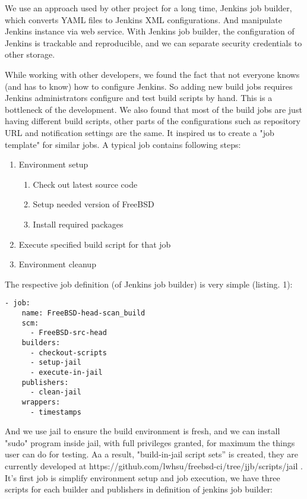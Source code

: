 \documentclass[a4paper,twocolumn,10pt]{article}
\begin{document}
We use an approach used by other project for a long time, Jenkins job builder,
which converts YAML files to Jenkins XML configurations. And manipulate Jenkins
instance via web service. With Jenkins job builder, the configuration of
Jenkins is trackable and reproducible, and we can separate security credentials
to other storage.

While working with other developers, we found the fact that not everyone knows
(and has to know) how to configure Jenkins. So adding new build jobs requires
Jenkins administrators configure and test build scripts by hand. This is a
bottleneck of the development. We also found that most of the build jobs are
just having different build scripts, other parts of the configurations such as
repository URL and notification settings are the same. It inspired us to create
a "job template" for similar jobs. A typical job contains following steps:

\begin{enumerate}
\item Environment setup
  \begin{enumerate}
  \item Check out latest source code
  \item Setup needed version of FreeBSD
  \item Install required packages
  \end{enumerate}
\item Execute specified build script for that job
\item Environment cleanup
\end{enumerate}

The respective job definition (of Jenkins job builder) is very simple
(listing. 1):

\begin{lstlisting}
- job:
    name: FreeBSD-head-scan_build
    scm:
      - FreeBSD-src-head
    builders:
      - checkout-scripts
      - setup-jail
      - execute-in-jail
    publishers:
      - clean-jail
    wrappers:
      - timestamps
\end{lstlisting}

And we use jail to ensure the build environment is fresh, and we can install
"sudo" program inside jail, with full privileges granted, for maximum the
things user can do for testing. Aa a result, "build-in-jail script sets” is
created, they are currently developed at
https://github.com/lwhsu/freebsd-ci/tree/jjb/scripts/jail . It’s first job is
simplify environment setup and job execution, we have three scripts for each
builder and publishers in definition of jenkins job builder:
\end{document}
